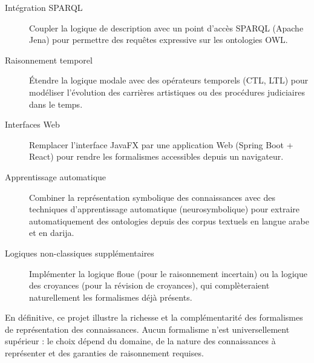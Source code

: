 \begin{description}
  \item[Intégration SPARQL] Coupler la logique de description avec un point
        d'accès SPARQL (Apache Jena) pour permettre des requêtes expressive
        sur les ontologies OWL.

  \item[Raisonnement temporel] Étendre la logique modale avec des opérateurs
        temporels (CTL, LTL) pour modéliser l'évolution des carrières
        artistiques ou des procédures judiciaires dans le temps.

  \item[Interfaces Web] Remplacer l'interface JavaFX par une application Web
        (Spring Boot + React) pour rendre les formalismes accessibles depuis
        un navigateur.

  \item[Apprentissage automatique] Combiner la représentation symbolique
        des connaissances avec des techniques d'apprentissage automatique
        (neurosymbolique) pour extraire automatiquement des ontologies depuis
        des corpus textuels en langue arabe et en darija.

  \item[Logiques non-classiques supplémentaires] Implémenter la logique floue
        (pour le raisonnement incertain) ou la logique des croyances (pour
        la révision de croyances), qui complèteraient naturellement les
        formalismes déjà présents.
\end{description}

\bigskip
\noindent En définitive, ce projet illustre la richesse et la complémentarité
des formalismes de représentation des connaissances.
Aucun formalisme n'est universellement supérieur : le choix dépend du domaine,
de la nature des connaissances à représenter et des garanties de raisonnement
requises.
